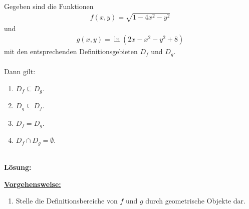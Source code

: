 \subsection*{}
Gegeben sind die Funktionen
\begin{align*}
f(x,y) = \sqrt{1 - 4  x^2 - y^2}
\end{align*}
und
\begin{align*}
g(x,y)
= 
\ln(2  x - x^2 - y^2 + 8) 
\end{align*}
mit den entsprechenden Definitionsgebieten $ D_f $ und $ D_g $.\\
\\
Dann gilt:
\renewcommand{\labelenumi}{(\alph{enumi})}
\begin{enumerate}
	\item 
	$ D_f \subseteq D_g $.
	\item
	$ D_g \subseteq D_f $.
	\item
	$ D_f = D_g $.
	\item
	$ D_f \cap D_g = \emptyset $.
\end{enumerate}
\ \\
\textbf{Lösung:}
\begin{mdframed}
\underline{\textbf{Vorgehensweise:}}
\renewcommand{\labelenumi}{\theenumi.}
\begin{enumerate}
\item Stelle die Definitionsbereiche von $ f $ und $ g $ durch geometrische Objekte dar.
\end{enumerate}
\end{mdframed}

